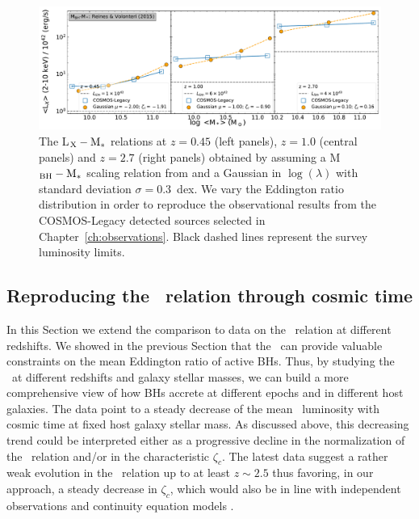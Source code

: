 \begin{figure}
\begin{center}
  \includegraphics[width=\textwidth]{Figs/Chapter3/fig3_active.pdf}
  \caption{The L$_{\rm X}-{\rm M}_*$ relations at $z=0.45$ (left panels), $z=1.0$
  (central panels) and $z=2.7$ (right panels) obtained by assuming a M$_{\rm BH}-{\rm M}_*$
  scaling relation from \citet{2015ApJ...813...82R} and a Gaussian in $\log (\lambda)$ with
  standard deviation $\sigma=0.3$~dex. We vary the Eddington ratio distribution in order to
  reproduce the observational results from the COSMOS-Legacy detected sources selected in Chapter~\ref{ch:observations}.
  Black dashed lines represent the survey luminosity limits.}

    \label{fig:LX_M_redshift}
\end{center}
\end{figure}


\subsection{Reproducing the \LXMS\ relation through cosmic time}

In this Section we extend the comparison to data on the \LXMS\ relation at different redshifts. We showed in the previous Section that the \LX\ can provide valuable constraints on the mean Eddington ratio of active BHs. Thus, by studying the \LXMS\ at different redshifts and galaxy stellar masses, we can build a more comprehensive view of how BHs accrete at different epochs and in different host galaxies.
The data point to a steady decrease of the mean \LXMS\ luminosity with cosmic time at fixed host galaxy stellar mass. As discussed above, this decreasing trend could be interpreted either as a progressive decline in the normalization of the \MBHMS\ relation and/or in the characteristic $\zeta_c$. The latest data suggest a rather weak evolution in the \MBHMS\ relation up to at least $z\sim 2.5$ \citep[e.g.,][]{2020ApJ...889...32S,2020MNRAS.493.1500S} thus favoring, in our approach, a steady decrease in $\zeta_c$, which would also be in line with independent observations \citep[]{Kollmeier06} and continuity equation models \citep[][]{Shankar13Acc,Aversa15}.



